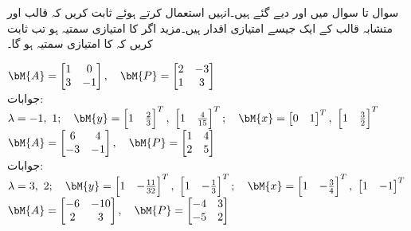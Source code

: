 سوال  تا سوال  میں  اور  دیے گئے ہیں۔انہیں استعمال کرتے ہوئے ثابت کریں کہ قالب  اور متشابہ قالب  کے ایک جیسے امتیازی اقدار ہیں۔مزید اگر  کا امتیازی سمتیہ  ہو تب ثابت کریں کہ  کا امتیازی سمتیہ  ہو گا۔

\quad
$\bM{A}=\begin{bmatrix} 1&0\\3&-1 \end{bmatrix},\quad \bM{P}=\begin{bmatrix} 2&-3\\1&3 \end{bmatrix}$\\
جوابات:
$\lambda=-1,\,\, 1;\quad \bM{y}=\begin{bmatrix} 1&\tfrac{2}{3} \end{bmatrix}^T,\,\,\begin{bmatrix} 1&\tfrac{4}{15} \end{bmatrix}^T; \quad 
\bM{x}=\begin{bmatrix} 0&1 \end{bmatrix}^T,\,\, \begin{bmatrix} 1&\tfrac{3}{2} \end{bmatrix}^T$
\quad
$\bM{A}=\begin{bmatrix} 6&4\\-3&-1 \end{bmatrix},\quad \bM{P}=\begin{bmatrix} 1&4\\2&5 \end{bmatrix}$\\
جوابات:
$\lambda=3,\,\,2;\quad \bM{y}=\begin{bmatrix} 1&-\tfrac{11}{32} \end{bmatrix}^T,\,\,\begin{bmatrix} 1&-\tfrac{1}{3} \end{bmatrix}^T; \quad 
\bM{x}=\begin{bmatrix} 1&-\tfrac{3}{4} \end{bmatrix}^T,\,\, \begin{bmatrix} 1&-1 \end{bmatrix}^T$
\quad
$\bM{A}=\begin{bmatrix} -6&-10\\2&3 \end{bmatrix},\quad \bM{P}=\begin{bmatrix} -4&3\\-5&2 \end{bmatrix}$\\
